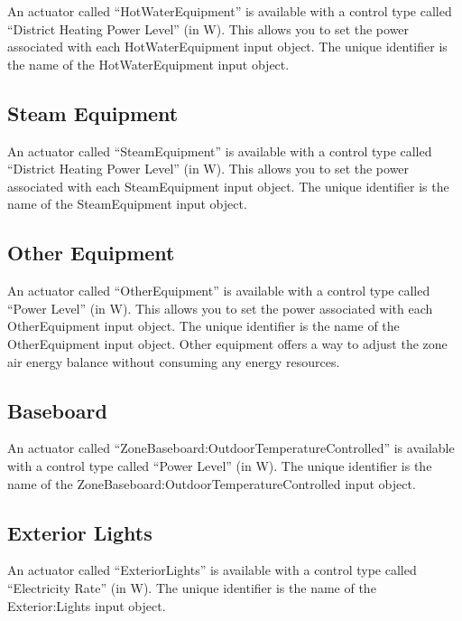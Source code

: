An actuator called ``HotWaterEquipment'' is available with a control type called ``District Heating Power Level'' (in W). This allows you to set the power associated with each HotWaterEquipment input object. The unique identifier is the name of the HotWaterEquipment input object.

\subsection{Steam Equipment}\label{steam-equipment}

An actuator called ``SteamEquipment'' is available with a control type called ``District Heating Power Level'' (in W). This allows you to set the power associated with each SteamEquipment input object. The unique identifier is the name of the SteamEquipment input object.

\subsection{Other Equipment}\label{other-equipment}

An actuator called ``OtherEquipment'' is available with a control type called ``Power Level'' (in W). This allows you to set the power associated with each OtherEquipment input object. The unique identifier is the name of the OtherEquipment input object.  Other equipment offers a way to adjust the zone air energy balance without consuming any energy resources.

\subsection{Baseboard}\label{baseboard}

An actuator called ``ZoneBaseboard:OutdoorTemperatureControlled'' is available with a control type called ``Power Level'' (in W). The unique identifier is the name of the ZoneBaseboard:OutdoorTemperatureControlled input object.

\subsection{Exterior Lights}\label{exterior-lights}

An actuator called ``ExteriorLights'' is available with a control type called ``Electricity Rate'' (in W). The unique identifier is the name of the Exterior:Lights input object.
